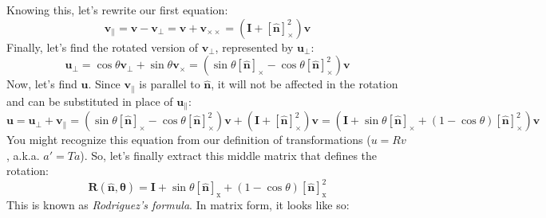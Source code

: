 \documentclass{article}
\begin{document}
\noindent
Knowing this, let's rewrite our first equation:
\[
\boldsymbol { v } _ { \| } = 
\boldsymbol { v } - \boldsymbol { v } _ { \perp } = \boldsymbol { v } + \boldsymbol { v } _ { \times \times } = 
\left( \boldsymbol { I } + [ \hat { \boldsymbol { n } } ] _ { \times } ^ { 2 } \right) \boldsymbol { v }
\]
\noindent
Finally, let's find the rotated version of $\mathbf{v_\perp}$, represented by $\mathbf{u_\perp}$:
\[
\boldsymbol { u } _ { \perp } = 
\cos \theta \boldsymbol { v } _ { \perp } + \sin \theta \boldsymbol { v } _ { \times } = 
\left( \sin \theta [ \hat { \boldsymbol { n } } ] _ { \times } - \cos \theta [ \hat { \boldsymbol { n } } ] _ { \times } ^ { 2 } \right) \boldsymbol { v }
\]
\noindent
Now, let's find $\mathbf u$. Since $\mathbf{v_\|}$ is parallel to $\mathbf{\hat n}$, it will not be affected in the rotation and can be substituted in place of $\mathbf{u_\|}$:
\[
\boldsymbol { u } = 
\boldsymbol { u } _ { \perp } + \boldsymbol { v } _ { \| } = 
\left( \sin \theta [ \hat { \boldsymbol { n } } ] _ { \times } - \cos \theta [ \hat { \boldsymbol { n } } ] _ { \times } ^ { 2 } \right) \boldsymbol { v } + \left( \boldsymbol { I } + [ \hat { \boldsymbol { n } } ] _ { \times } ^ { 2 } \right) \boldsymbol { v } = 
\left( \boldsymbol { I } + \sin \theta [ \hat { \boldsymbol { n } } ] _ { \times } + ( 1 - \cos \theta ) [ \hat { \boldsymbol { n } } ] _ { \times } ^ { 2 } \right) \boldsymbol { v }
\]
\noindent
You might recognize this equation from our definition of transformations ($u = Rv$, a.k.a. $a' = Ta$). So, let's finally extract this middle matrix that defines the rotation:
\[
\boldsymbol { R } ( \hat { \boldsymbol { n } } , \boldsymbol { \theta } ) = \boldsymbol { I } + \sin \theta [ \hat { \boldsymbol { n } } ] _ { \mathrm { x } } + ( 1 - \cos \theta ) [ \hat { \boldsymbol { n } } ] _ { \mathrm { x } } ^ { 2 }
\]
\noident
This is known as \textit{Rodriguez’s formula}. In matrix form, it looks like so:
\end{document}
